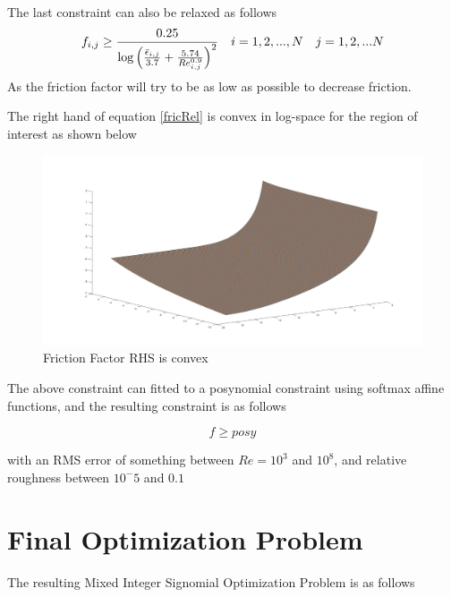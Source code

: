 \documentclass[12pt]{article}
\begin{document}
	The last constraint can also be relaxed as follows
	\begin{equation}
	f_{i,j} \geq \frac{0.25}{\log\left(\frac{\bar{\epsilon}_{i,j}}{3.7} + \frac{5.74}{Re_{i,j}^{0.9}}\right)^2} \quad i = 1, 2, ..., N \quad j = 1, 2, ... N\\
	\label{fricRel}
	\end{equation}
	As the friction factor will try to be as low as possible to decrease friction.
	
	The right hand of equation \eqref{fricRel} is convex in log-space for the region of interest as shown below
	\begin{figure}
		\centering
		\includegraphics[scale=0.3]{frictionFactorLogSpace.png}
		\caption{Friction Factor RHS is convex}
		\label{fig:fricFactorLogSpace}
	\end{figure}
	The above constraint can fitted to a posynomial constraint using softmax affine functions, and the resulting constraint is as follows
	
	\begin{equation}
	f \geq posy
	\end{equation}
	
	with an RMS error of something between $Re = 10^3$ and $10^8$, and relative roughness between $10^-5$ and $0.1$
	
	\newpage
	
	\section{Final Optimization Problem}
	
	The resulting Mixed Integer Signomial Optimization Problem is as follows
	
\end{document}
